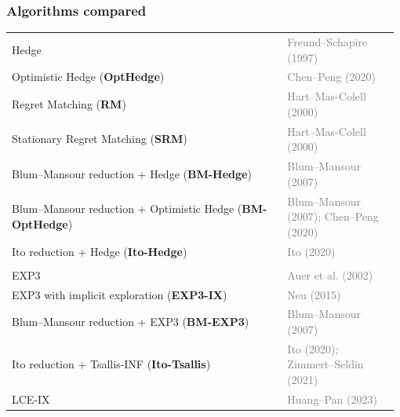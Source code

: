 \begin{frame}
  \frametitle{Algorithms compared}

  \hspace*{-0.025\textwidth}%
  \begin{minipage}{1.05\textwidth}

  {\footnotesize
  \renewcommand{\arraystretch}{1.16}
  \begin{tabular}{
    @{}
    >{\raggedright\arraybackslash}p{0.69\linewidth}
    >{\raggedright\arraybackslash}p{0.29\linewidth}
    @{}
  }

    Hedge
    &
    {\scriptsize\textcolor{gray}{Freund--Schapire (1997)}} \\

    Optimistic Hedge (\textbf{OptHedge})
    &
    {\scriptsize\textcolor{gray}{Chen--Peng (2020)}} \\

    Regret Matching (\textbf{RM})
    &
    {\scriptsize\textcolor{gray}{Hart--Mas-Colell (2000)}} \\

    Stationary Regret Matching (\textbf{SRM})
    &
    {\scriptsize\textcolor{gray}{Hart--Mas-Colell (2000)}} \\

    Blum--Mansour reduction + Hedge (\textbf{BM-Hedge})
    &
    {\scriptsize\textcolor{gray}{Blum--Mansour (2007)}} \\

    Blum--Mansour reduction + Optimistic Hedge
    (\textbf{BM-OptHedge})
    &
    {\scriptsize\textcolor{gray}{
      Blum--Mansour (2007); Chen--Peng (2020)
    }} \\

    Ito reduction + Hedge (\textbf{Ito-Hedge})
    &
    {\scriptsize\textcolor{gray}{Ito (2020)}} \\[-0.16cm]

    \multicolumn{2}{@{}l@{}}{%
      \textcolor{TUMblue}{\rule{\linewidth}{0.35pt}}%
    } \\

    EXP3
    &
    {\scriptsize\textcolor{gray}{Auer et al. (2002)}} \\

    EXP3 with implicit exploration (\textbf{EXP3-IX})
    &
    {\scriptsize\textcolor{gray}{Neu (2015)}} \\

    Blum--Mansour reduction + EXP3 (\textbf{BM-EXP3})
    &
    {\scriptsize\textcolor{gray}{Blum--Mansour (2007)}} \\

    Ito reduction + Tsallis-INF (\textbf{Ito-Tsallis})
    &
    {\scriptsize\textcolor{gray}{
      Ito (2020); Zimmert--Seldin (2021)
    }} \\

    LCE-IX
    &
    {\scriptsize\textcolor{gray}{Huang--Pan (2023)}}

  \end{tabular}
  }

  \end{minipage}

\end{frame}
